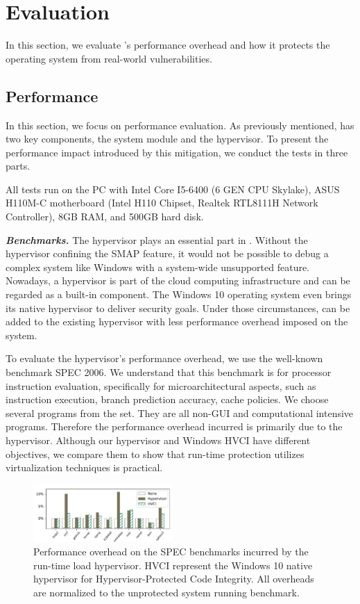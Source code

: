 
\section{Evaluation}
\label{sec:ktoctou-evaluation}

In this section, we evaluate \name's performance overhead and how it protects the operating system from real-world vulnerabilities.


\subsection{Performance}
In this section, we focus on performance evaluation.
As previously mentioned, \name has two key components, the system module and the hypervisor. To present the performance impact introduced by this mitigation, we conduct the tests in three parts. 

All tests run on the PC with Intel Core I5-6400 (6 GEN CPU Skylake), ASUS H110M-C motherboard (Intel H110 Chipset, Realtek RTL8111H Network Controller), 8GB RAM, and 500GB hard disk.

\textbf{\textit{Benchmarks.}} The hypervisor plays an essential part in \name. Without the hypervisor confining the SMAP feature, it would not be possible to debug a complex system like Windows with a system-wide unsupported feature. Nowadays, a hypervisor is part of the cloud computing infrastructure and can be regarded as a built-in component. The Windows 10 operating system even brings its native hypervisor to deliver security goals. Under those circumstances, \name can be added to the existing hypervisor with less performance overhead imposed on the system. 

To evaluate the hypervisor's performance overhead, we use the well-known benchmark SPEC 2006. We understand that this benchmark is for processor instruction evaluation, specifically for microarchitectural aspects, such as instruction execution, branch prediction accuracy, cache policies. We choose several programs from the set. They are all non-GUI and computational intensive programs. Therefore the performance overhead incurred is primarily due to the hypervisor. Although our hypervisor and Windows HVCI have different objectives, we compare them to show that run-time protection utilizes virtualization techniques is practical.

\begin{figure}[th]
  \includegraphics[width=0.47\textwidth]{figures/benchmark3}
  \centering
  \caption{Performance overhead on the SPEC benchmarks incurred by the run-time load hypervisor. HVCI represent the Windows 10 native hypervisor for Hypervisor-Protected Code Integrity. All overheads are normalized to the unprotected system running benchmark.}
  \label{fig:ktoctou-benchmark}
\end{figure}


